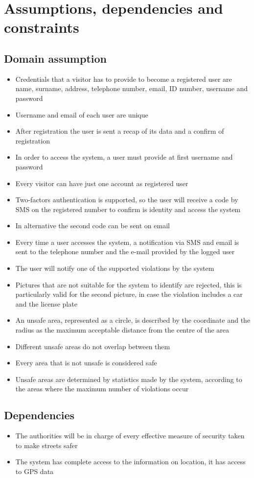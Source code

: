 \section{Assumptions, dependencies and constraints}

\subsection{Domain assumption}
  \begin{itemize}
    \item Credentials that a visitor has to provide to become a registered user are name, surname, address, telephone number, email, ID number, username and password
    \item Username and email of each user are unique
    \item After registration the user is sent a recap of its data and a confirm of registration
    \item In order to access the system, a user must provide at first username and password
    \item Every visitor can have just one account as registered user
    \item Two-factors authentication is supported, so the user will receive a code by SMS on the registered number to confirm is identity and access the system
    \item In alternative the second code can be sent on email
    \item Every time a user accesses the system, a notification via SMS and email is sent to the telephone number and the e-mail provided by the logged user
    \item The user will notify one of the supported violations by the system
    \item Pictures that are not suitable for the system to identify are rejected, this is particularly valid for the second picture, in case the violation includes a car and the license plate 
    \item An unsafe area, represented as a circle, is described by the coordinate and the radius as the maximum acceptable distance from the centre of the area
    \item Different unsafe areas do not overlap between them
    \item Every area that is not unsafe is considered safe
    \item Unsafe areas are determined by statistics made by the system, according to the areas where the maximum number of violations occur 
  \end{itemize}

\subsection{Dependencies}
  \begin{itemize}
    \item The authorities will be in charge of every effective measure of security taken to make streets safer
    \item The system has complete access to the information on location, it has access to GPS data
  \end{itemize}
